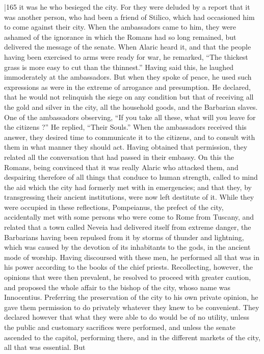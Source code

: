 |165 it was he who besieged the city. For they were deluded by a report that it was another person, who had been a friend of Stilico, which had occasioned him to come against their city. When the ambassadors came to him, they were ashamed of the ignorance in which the Romans had so long remained, but delivered the message of the senate. When Alaric heard it, and that the people having been exercised to arms were ready for war, he remarked, ``The thickest grass is more easy to cut than the thinnest.'' Having said this, he laughed immoderately at the ambassadors. But when they spoke of peace, he used such expressions as were in the extreme of arrogance and presumption. He declared, that he would not relinquish the siege on any condition but that of receiving all the gold and silver in the city, all the household goods, and the Barbarian slaves. One of the ambassadors observing, ``If you take all these, what will you leave for the citizens ?'' He replied, ``Their Souls.'' When the ambassadors received this answer, they desired time to communicate it to the citizens, and to consult with them in what manner they should act. Having obtained that permission, they related all the conversation that had passed in their embassy. On this the Romans, being convinced that it was really Alaric who attacked them, and despairing therefore of all things that conduce to human strength, called to mind the aid which the city had formerly met with in emergencies; and that they, by transgressing their ancient institutions, were now left destitute of it. While they were occupied in these reflections, Pompeianus, the prefect of the city, accidentally met with some persons who were come to Rome from Tuscany, and related that a town called Neveia had delivered itself from extreme danger, the Barbarians having been repulsed from it by storms of thunder and lightning, which was caused by the devotion of its inhabitants to the gods, in the ancient mode of worship. Having discoursed with these men, he performed all that was in his power according to the books of the chief priests. Recollecting, however, the opinions that were then prevalent, he resolved to proceed with greater caution, and proposed the whole affair to the bishop of the city, whoso name was Innocentius. Preferring the preservation of the city to his own private opinion, he gave them permission to do privately whatever they knew to be convenient. They declared however that what they were able to do would be of no utility, unless the public and customary sacrifices were performed, and unless the senate ascended to the capitol, performing there, and in the different markets of the city, all that was essential. But
